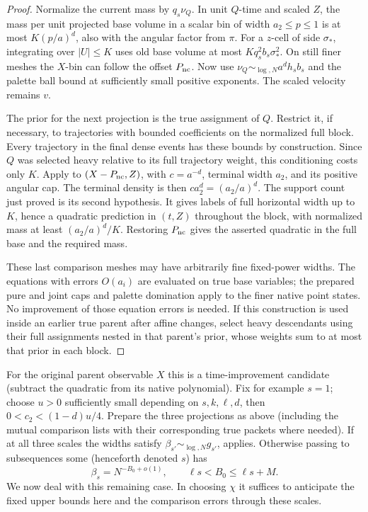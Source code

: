 \begin{proof}
Normalize the current mass by \(q_s\nu_Q\).  In unit
\(Q\)-time and scaled \(Z\), the mass per unit projected base
volume in a scalar bin of width \(a_2\le p\le1\) is at most
\(K(p/a)^d\), also with the angular factor from \(\pi\).
For a \(z\)-cell of side \(\sigma_*\), integrating over
\(|U|\le K\) uses old base volume at most
\(Kq_s^2b_s\sigma_*^2\).  On still finer meshes the
\(X\)-bin can follow the offset \(P_{\rm nc}\).
Now use \(\nu_Q\sim_{\log,N}a^dh_sb_s\) and the palette ball
bound at sufficiently small positive exponents.  The scaled velocity
remains \(v\).

The prior for the next projection is the true assignment of \(Q\).
Restrict it, if necessary, to trajectories with bounded coefficients
on the normalized full block.  Every trajectory in the final dense
events has these bounds by construction.  Since \(Q\) was selected
heavy relative to its full trajectory weight, this conditioning costs
only \(K\).  Apply  to
\((X-P_{\rm nc},Z)\), with \(c=a^{-d}\), terminal width
\(a_2\), and its positive angular cap.  The terminal density is
then \(ca_2^d=(a_2/a)^d\).  The support
count just proved is its second hypothesis.  It gives labels of full
horizontal width up to \(K\), hence a quadratic prediction in
\((t,Z)\) throughout the block, with normalized mass at least
\((a_2/a)^d/K\).  Restoring \(P_{\rm nc}\) gives the asserted
quadratic in the full base and the required mass.

These last comparison meshes may have arbitrarily fine fixed-power
widths.  The equations with errors \(O(a_i)\) are evaluated on
true base variables; the prepared pure and joint caps and palette
domination apply to the finer native point states.  No improvement
of those equation errors is needed.  If this construction is used
inside an earlier true parent after affine changes, select heavy
descendants using their full assignments nested in that parent's
prior, whose weights sum to at most that prior in each block.

\end{proof}
For the original parent observable \(X\) this is a time-improvement candidate (subtract the quadratic from its native polynomial). Fix for example \(s=1\); choose \(u>0\) sufficiently small depending on \(s,k,\ell,d\), then \(0<c_2<(1-d)u/4\). Prepare the three projections as above (including the mutual comparison lists with their corresponding true packets where needed). If at all three scales the widths satisfy \(\beta_{s'}\sim_{\log,N}g_{s'}\),  applies. Otherwise passing to subsequences some (henceforth denoted \(s\)) has
\[
 \beta_s=N^{-B_0+o(1)},\qquad \ell s<B_0\le\ell s+M.
\]
We now deal with this remaining case. In choosing \(\chi\) it suffices to anticipate the fixed upper bounds here and the comparison errors through these scales.

